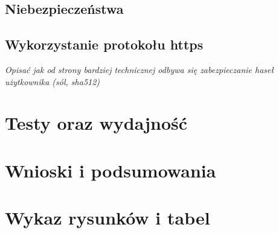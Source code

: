 \documentclass[a4paper,12pt,twoside]{article}
\begin{document}
\subsection{Niebezpieczeństwa}
\subsection{Wykorzystanie protokołu https}
\textit{Opisać jak od strony bardziej technicznej odbywa się zabezpieczanie haseł użytkownika (sól, sha512) }
\newpage
\section{Testy oraz wydajność}  
\newpage
\section{Wnioski i podsumowania}  

\newpage
\begin{thebibliography}{99}
\end{thebibliography}

\newpage
\section*{Wykaz rysunków i tabel} 
\end{document}
